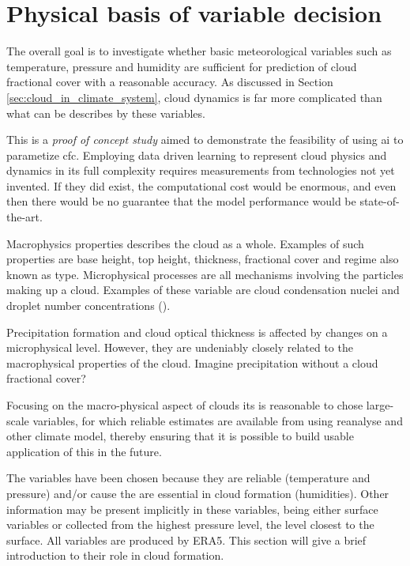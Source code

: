 \section{Physical basis of variable decision} \label{sec:ecc}
The overall goal is to investigate whether basic meteorological variables such as temperature, pressure and humidity are sufficient for prediction of cloud fractional cover with a reasonable accuracy. As discussed in Section \ref{sec:cloud_in_climate_system}, cloud dynamics is far more complicated than what can be describes by these variables. 

This is a \textit{proof of concept study} aimed to demonstrate the feasibility of using \acrshort{ai} to parametize \acrshort{cfc}. Employing data driven learning to represent cloud physics and dynamics in its full complexity requires measurements from technologies not yet invented. If they did exist, the computational cost would be enormous, and even then there would be no guarantee that the model performance would be state-of-the-art.

Macrophysics properties describes the cloud as a whole. Examples of such properties are base height, top height, thickness, fractional cover and regime also known as type. Microphysical processes are all mechanisms involving the particles making up a cloud. Examples of these variable are cloud condensation nuclei and droplet number concentrations (\cite{Grabowski2019ModelingBetter}). 

Precipitation formation and cloud optical thickness is affected by changes on a microphysical level. However, they are undeniably closely related to the macrophysical properties of the cloud. Imagine precipitation without a cloud fractional cover? 

Focusing on the macro-physical aspect of clouds its is reasonable to chose large-scale variables, for which reliable estimates are available from using reanalyse and other climate model, thereby ensuring that it is possible to build usable application of this in the future. 

The variables have been chosen because they are reliable (temperature and pressure) and/or cause the are essential in cloud formation (humidities). Other information may be present implicitly in these variables, being either surface variables or collected from the highest pressure level, the level closest to the surface. All variables are produced by ERA5. This section will give a brief introduction to their role in cloud formation. 

